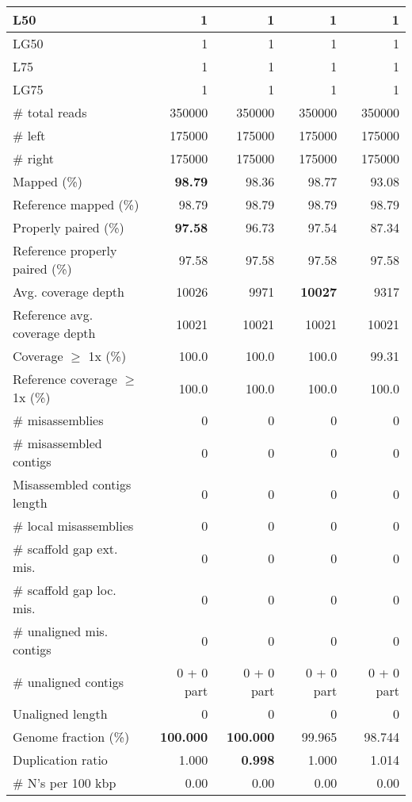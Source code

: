 \documentclass[12pt,a4paper]{article}
\begin{document}
\begin{table}[ht]
\begin{center}
\begin{tabular}{|l*{4}{|r}|}
L50 & 1 & 1 & 1 & 1 \\ \hline
LG50 & 1 & 1 & 1 & 1 \\ \hline
L75 & 1 & 1 & 1 & 1 \\ \hline
LG75 & 1 & 1 & 1 & 1 \\ \hline
\# total reads & 350000 & 350000 & 350000 & 350000 \\ \hline
\# left & 175000 & 175000 & 175000 & 175000 \\ \hline
\# right & 175000 & 175000 & 175000 & 175000 \\ \hline
Mapped (\%) & {\bf 98.79} & 98.36 & 98.77 & 93.08 \\ \hline
Reference mapped (\%) & 98.79 & 98.79 & 98.79 & 98.79 \\ \hline
Properly paired (\%) & {\bf 97.58} & 96.73 & 97.54 & 87.34 \\ \hline
Reference properly paired (\%) & 97.58 & 97.58 & 97.58 & 97.58 \\ \hline
Avg. coverage depth & 10026 & 9971 & {\bf 10027} & 9317 \\ \hline
Reference avg. coverage depth & 10021 & 10021 & 10021 & 10021 \\ \hline
Coverage $\geq$ 1x (\%) & 100.0 & 100.0 & 100.0 & 99.31 \\ \hline
Reference coverage $\geq$ 1x (\%) & 100.0 & 100.0 & 100.0 & 100.0 \\ \hline
\# misassemblies & 0 & 0 & 0 & 0 \\ \hline
\# misassembled contigs & 0 & 0 & 0 & 0 \\ \hline
Misassembled contigs length & 0 & 0 & 0 & 0 \\ \hline
\# local misassemblies & 0 & 0 & 0 & 0 \\ \hline
\# scaffold gap ext. mis. & 0 & 0 & 0 & 0 \\ \hline
\# scaffold gap loc. mis. & 0 & 0 & 0 & 0 \\ \hline
\# unaligned mis. contigs & 0 & 0 & 0 & 0 \\ \hline
\# unaligned contigs & 0 + 0 part & 0 + 0 part & 0 + 0 part & 0 + 0 part \\ \hline
Unaligned length & 0 & 0 & 0 & 0 \\ \hline
Genome fraction (\%) & {\bf 100.000} & {\bf 100.000} & 99.965 & 98.744 \\ \hline
Duplication ratio & 1.000 & {\bf 0.998} & 1.000 & 1.014 \\ \hline
\# N's per 100 kbp & 0.00 & 0.00 & 0.00 & 0.00 \\ \hline

\end{tabular}
\end{center}
\end{table}
\end{document}
